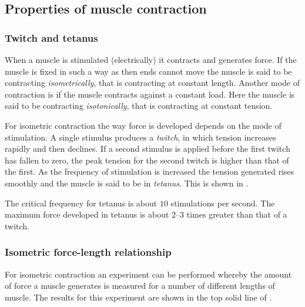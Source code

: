 \subsection{Properties of muscle contraction}
\label{sec:musclecontraction}

\subsubsection{Twitch and tetanus}

When a muscle is stimulated (electrically) it contracts and generates
force. If the muscle is fixed in such a way as then ends cannot move the
muscle is said to be contracting \emph{isometrically}, that is contracting at
constant length. Another mode of contraction is if the muscle contracts
against a constant load. Here the muscle is said to be contracting
\emph{isotonically}, that is contracting at constant tension.

For isometric contraction the way force is developed depends on the mode of
stimulation. A single stimulus produces a \emph{twitch}, in which tension
increases rapidly and then declines. If a second stimulus is applied before
the first twitch has fallen to zero, the peak tension for the second twitch is
higher than that of the first. As the frequency of stimulation is increased
the tension generated rises smoothly and the muscle is said to be in
\emph{tetanus}.  This is shown in .


The critical frequency for tetanus is about $10$ stimulations per second. The
maximum force developed in tetanus is about $2$--$3$ times greater than that
of a twitch.

\subsubsection{Isometric force-length relationship}

For isometric contraction an experiment can be performed whereby the amount of
force a muscle generates is measured for a number of different lengths of
muscle.  The results for this experiment are shown in the top solid line of
.


